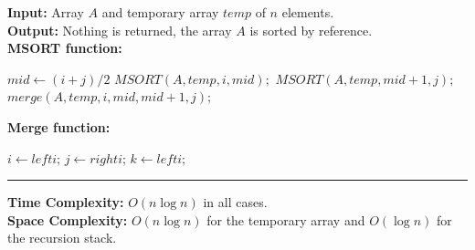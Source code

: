 \newpage

\begin{Func}
    \textbf{Input:} Array $A$ and temporary array $temp$ of $n$ elements.\\
    \textbf{Output:} Nothing is returned, the array $A$ is sorted by reference.\\

    \vspace{-.5em}
    \noindent
    \textbf{MSORT function:}\\
    \begin{algorithm}[H]
        \label{algo:mergesort}
            $mid \gets (i + j) / 2$\;
            $MSORT(A, temp, i, mid);$ 
            $MSORT(A, temp, mid + 1, j);$ 
            $merge(A, temp, i, mid, mid + 1, j);$ 
        
    \end{algorithm}

    \vspace{.5em}

    \noindent
    \textbf{Merge function:}\\
    \begin{algorithm}[H]
        $i \gets lefti$; 
        $j \gets righti$; 
        $k \gets lefti$; 
        
        
        
        
    \end{algorithm}

    \noindent\rule{\textwidth}{0.4pt}

    \noindent
    \textbf{Time Complexity:} $O(n \log n)$ in all cases.\\
    \textbf{Space Complexity:} $O(n \log n)$ for the temporary array and $O(\log n)$ for the recursion stack.
\end{Func}




